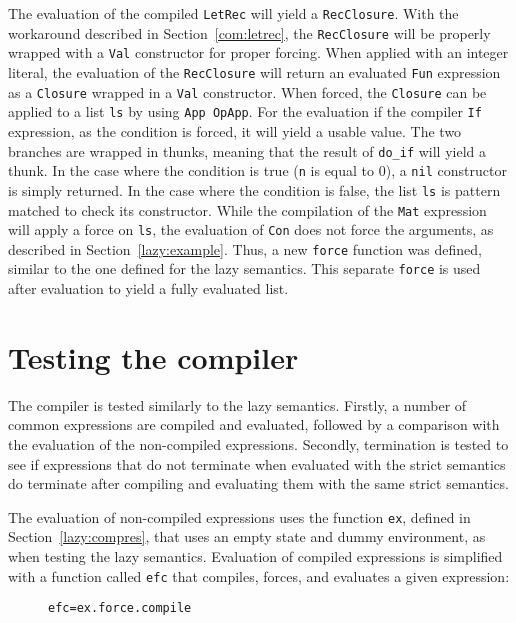 The evaluation of the compiled \texttt{LetRec} will yield a \texttt{RecClosure}.
With the workaround described in Section~\ref{com:letrec}, the \texttt{RecClosure}
will be properly wrapped with a \texttt{Val} constructor for proper forcing.
When applied with an integer literal, the evaluation of the \texttt{RecClosure}
will return an evaluated \texttt{Fun} expression as a \texttt{Closure} wrapped
in a \texttt{Val} constructor. When forced, the \texttt{Closure} can be applied
to a list \texttt{ls} by using \texttt{App OpApp}. For the evaluation if the
compiler \texttt{If} expression, as the condition is forced, it will yield a
usable value. The two branches are wrapped in thunks, meaning that the result
of \texttt{do\_if} will yield a thunk. In the case where the condition is true
(\texttt{n} is equal to 0), a \texttt{nil} constructor is simply returned.
In the case where the condition is false, the list \texttt{ls} is pattern matched
to check its constructor. While the compilation of the \texttt{Mat} expression
will apply a force on \texttt{ls}, the evaluation of \texttt{Con} does not force
the arguments, as described in Section~\ref{lazy:example}. Thus, a new
\texttt{force} function was defined, similar to the one defined for the lazy
semantics. This separate \texttt{force} is used after evaluation to yield a
fully evaluated list.


\section{Testing the compiler}
\label{compiler:test}
The compiler is tested similarly to the lazy semantics. Firstly, a number of
common expressions are compiled and evaluated, followed by a comparison with
the evaluation of the non-compiled expressions. Secondly, termination is tested
to see if expressions that do not terminate when evaluated with the strict
semantics do terminate after compiling and evaluating them with the same
strict semantics.

The evaluation of non-compiled expressions uses the function \texttt{ex},
defined in Section~\ref{lazy:compres}, that uses an empty state and
dummy environment, as when testing the lazy semantics. Evaluation of
compiled expressions is simplified with a function called \texttt{efc} that
compiles, forces, and evaluates a given expression:

\begin{figure}[H]
\begin{alltt}
  efc = ex . force . compile
\end{alltt}
\end{figure}

